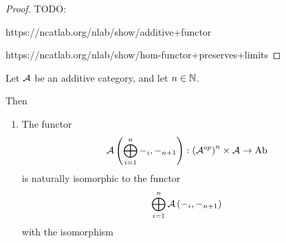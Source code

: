 \begin{proof}
    TODO: 
    
    https://ncatlab.org/nlab/show/additive+functor

    https://ncatlab.org/nlab/show/hom-functor+preserves+limits
\end{proof}


\begin{lemma} \label{lem:hom_split_over_direct_sum_n_naturally}
    Let \( {\mathcal{A}} \) be an additive category, and let \( n \in {\mathbb{N}} \).
    
    Then 
    \begin{enumerate}
        \item {
            The functor
            \[
                {\mathcal{A}}\left( \bigoplus_{i = 1}^n -_i, -_{n + 1} \right): \left( {\mathcal{A}}^{op} \right)^n \times {\mathcal{A}} \to \operatorname{Ab}
            \]
            is naturally isomorphic to the functor
            \[
                \bigoplus_{i = 1}^n {\mathcal{A}}\left( -_i, -_{n + 1} \right)
            \]
            with the isomorphism
            \begin{center}
\end{center}}
\end{enumerate}
\end{lemma}
